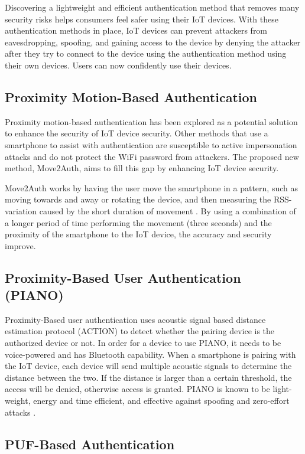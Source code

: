 \documentclass[10pt,twocolumn,letterpaper]{article}
\begin{document}
Discovering a lightweight and efficient authentication method that removes many security risks helps consumers feel safer using their IoT devices. With these authentication methods in place, IoT devices can prevent attackers from eavesdropping, spoofing, and gaining access to the device by denying the attacker after they try to connect to the device using the authentication method using their own devices\cite{proxmotion}\cite{piano}. Users can now confidently use their devices.

\subsection{Proximity Motion-Based Authentication}
Proximity motion-based authentication has been explored as a potential solution to enhance the security of IoT device security. Other methods that use a smartphone to assist with authentication are susceptible to active impersonation attacks and do not protect the WiFi password from attackers. The proposed new method, Move2Auth, aims to fill this gap by enhancing IoT device security.

Move2Auth works by having the user move the smartphone in a pattern, such as moving towards and away or rotating the device, and then measuring the RSS-variation caused by the short duration of movement \cite{proxmotion}. By using a combination of a longer period of time performing the movement (three seconds) and the proximity of the smartphone to the IoT device, the accuracy and security improve.

\subsection{Proximity-Based User Authentication (PIANO)}

Proximity-Based user authentication uses acoustic signal based distance estimation protocol (ACTION) to detect whether the pairing device is the authorized device or not. In order for a device to use PIANO, it needs to be voice-powered and has Bluetooth capability. When a smartphone is pairing with the IoT device, each device will send multiple acoustic signals to determine the distance between the two. If the distance is larger than a certain threshold, the access will be denied, otherwise access is granted. PIANO is known to be light-weight, energy and time efficient, and effective against spoofing and zero-effort attacks \cite{piano}.

\subsection{PUF-Based Authentication}
\end{document}
